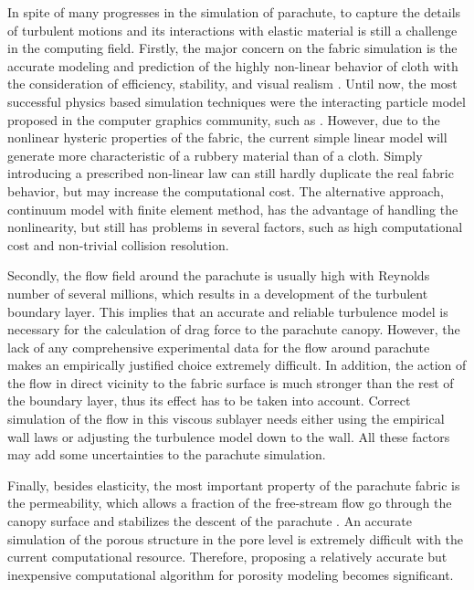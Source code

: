 In spite of many progresses in the simulation of parachute, to capture the
details of turbulent motions and its interactions with elastic material is
still a challenge in the computing field.  Firstly, the major concern on the
fabric simulation is the accurate modeling and prediction of the highly
non-linear behavior of cloth with the consideration of efficiency, stability,
and visual realism \cite{Choi2005}. Until now, the most successful physics
based simulation techniques were the interacting particle model proposed in the
computer graphics community, such as \cite{Baraff1998, Choi2002}. However, due
to the nonlinear hysteric properties of the fabric, the current simple linear
model will generate more characteristic of a rubbery material than of a cloth.
Simply introducing a prescribed non-linear law can still hardly duplicate the
real fabric behavior, but may increase the computational cost. The alternative
approach, continuum model with finite element method, has the advantage of
handling the nonlinearity, but still has problems in several factors, such as
high computational cost and non-trivial collision resolution.  

Secondly, the flow field around the parachute is usually high with Reynolds number of
several millions, which results in a development of the turbulent boundary
layer. This implies that an accurate and reliable turbulence model is
necessary for the calculation of drag force to the parachute canopy. However,
the lack of any comprehensive experimental data for the flow around parachute
makes an empirically justified choice extremely difficult. In addition, the
action of the flow in direct vicinity to the fabric surface is much stronger
than the rest of the boundary layer, thus its effect has to be taken into
account. Correct simulation of the flow in this viscous sublayer needs either
using the empirical wall laws or adjusting the turbulence model down to
the wall. All these factors may add some uncertainties to the parachute
simulation.  

Finally, besides elasticity, the most important property of the
parachute fabric is the permeability, which allows a fraction of the
free-stream flow go through the canopy surface and stabilizes the descent of
the parachute \cite{Johari2005}. An accurate simulation of the porous structure
in the pore level is extremely difficult with the current computational
resource. Therefore, proposing a relatively accurate but inexpensive
computational algorithm for porosity modeling becomes significant.

